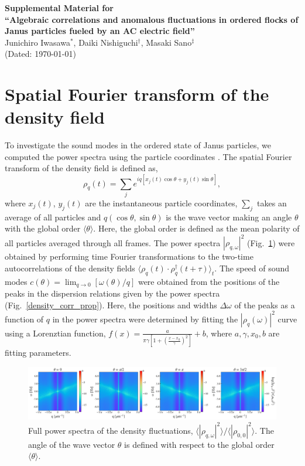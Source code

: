 \documentclass[%
 reprint,
 amsmath,amssymb,
 aps,
 floatfix
]{revtex4-2}
\begin{document}
\onecolumngrid
\makeatletter
\beginsupplement
\begin {center} 
	\textbf{ \large Supplemental Material for\\ ``Algebraic correlations and anomalous fluctuations in ordered flocks of\\ Janus particles fueled by an AC electric field''}\\ [.1cm]
	{Junichiro Iwasawa$^*$, Daiki Nishiguchi$^\dagger$, Masaki Sano$^\ddagger$}\\ [.1cm]
	{(Dated: \today)} \\
\end {center}

\section{Spatial Fourier transform of the density field}
To investigate the sound modes in the ordered state of Janus particles, we computed the power spectra using the particle coordinates \cite{bartolo2018}.
The spatial Fourier transform of the density field is defined as,
\begin{equation}
    \rho_q(t) = \sum_j e^{iq\left[x_j(t)\cos\theta + y_j(t)\sin\theta\right]},
\end{equation}
where $x_j(t)$, $y_j(t)$ are the instantaneous particle coordinates, $\sum_j$ takes an average of all particles and $q(\cos\theta, \sin\theta)$ is the wave vector making an angle $\theta$ with the global order $\langle\theta\rangle$. 
Here, the global order is defined as the mean polarity of all particles averaged through all frames. 
The power spectra $\left|\rho_{q,\omega}\right|^2$ (Fig.~\ref{density_corr}) were obtained by performing time Fourier transformations to the two-time autocorrelations of the density fields $\langle\rho_q(t)\cdot\rho_q^{\dagger}(t+\tau)\rangle_t$. 
The speed of sound modes
$c(\theta)=\lim_{q\rightarrow 0}
\left[
\omega\left(\theta\right)/q
\right]$
were obtained from the positions of the peaks in the dispersion relations given by the power spectra (Fig.~\ref{density_corr_prop}).
Here, the positions and widths $\Delta\omega$ of the peaks as a function of $q$ in the power spectra were determined by fitting the $\left|\rho_q(\omega)\right|^2$ curve using a Lorenztian function, $f(x)=\frac{a}{\pi\gamma\left[1+\left(\frac{x-x_0}{\gamma}\right)^2\right]}+b$, where $a,\gamma,x_0,b$ are fitting parameters.

\begin{figure}[htb]
\includegraphics[width=\columnwidth]{sup_density_fluctuations_subplot4.pdf}
\caption{\label{density_corr} 
Full power spectra of the density fluctuations, 
$\langle|\rho_{q,\omega}|^2\rangle / \langle|\rho_{0,0}|^2\rangle$.
The angle of the wave vector $\theta$ is defined with respect to the global order $\langle\theta\rangle$.
}
\end{figure}
\end{document}
